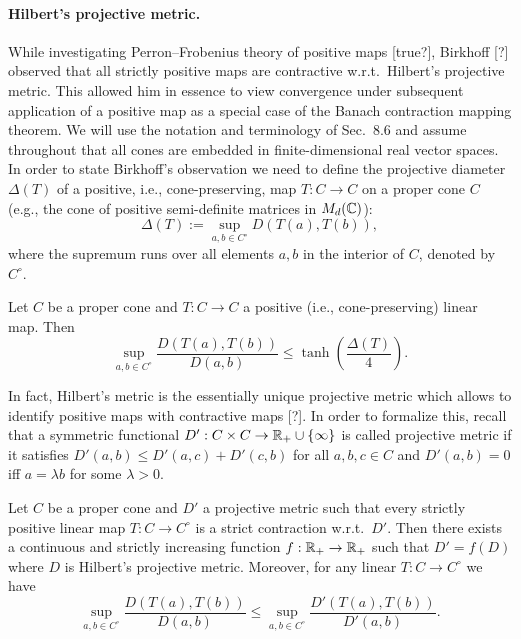\documentclass[11pt,a4paper]{article}
\theoremstyle{plain}
\theoremstyle{definition}
\theoremstyle{remark}
\begin{document}
\paragraph{Hilbert's projective metric.}
While investigating Perron--Frobenius theory of positive maps [true?], Birkhoff [?] observed that all strictly positive maps are contractive w.r.t.\ Hilbert's projective metric.
This allowed him in essence to view convergence under subsequent application of a positive map as a special case of the Banach contraction mapping theorem.
We will use the notation and terminology of Sec.~8.6 and assume throughout that all cones are embedded in finite-dimensional real vector spaces.
In order to state Birkhoff's observation we need to define the projective diameter $\Delta(T)$ of a positive, i.e., cone-preserving, map $T:C\to C$ on a proper cone $C$ (e.g., the cone of positive semi-definite matrices in $M_d(\mathbb{C})$):
\begin{equation}\tag{8.88}
    \Delta(T) := \sup_{a,b\in C^\circ} D(T(a),T(b)),
\end{equation}
where the supremum runs over all elements $a,b$ in the interior of $C$, denoted by $C^\circ$.

\begin{theorem}
    Let $C$ be a proper cone and $T:C\to C$ a positive (i.e., cone-preserving) linear map. Then
    \begin{equation}\tag{8.89}
        \sup_{a,b\in C^\circ}\frac{D(T(a),T(b))}{D(a,b)} \le \tanh\!\left(\frac{\Delta(T)}{4}\right).
    \end{equation}
\end{theorem}

In fact, Hilbert's metric is the essentially unique projective metric which allows to identify positive maps with contractive maps [?].
In order to formalize this, recall that a symmetric functional $D':C\times C\to \mathbb{R}_+\cup\{\infty\}$ is called projective metric if it satisfies
$D'(a,b)\le D'(a,c)+D'(c,b)$ for all $a,b,c\in C$ and $D'(a,b)=0$ iff $a=\lambda b$ for some $\lambda>0$.

\begin{theorem}
    Let $C$ be a proper cone and $D'$ a projective metric such that every strictly positive linear map $T:C\to C^\circ$ is a strict contraction w.r.t.\ $D'$.
    Then there exists a continuous and strictly increasing function $f:\mathbb{R}_+\to\mathbb{R}_+$ such that $D' = f(D)$ where $D$ is Hilbert's projective metric.
    Moreover, for any linear $T:C\to C^\circ$ we have
    \begin{equation}\tag{8.90}
        \sup_{a,b\in C^\circ}\frac{D(T(a),T(b))}{D(a,b)}
        \le
        \sup_{a,b\in C^\circ}\frac{D'(T(a),T(b))}{D'(a,b)}.
    \end{equation}
\end{theorem}
\end{document}
